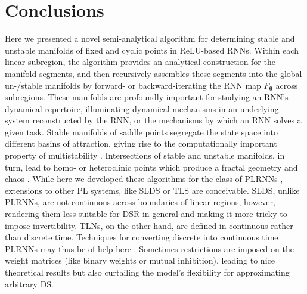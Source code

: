 \documentclass{article}
\theoremstyle{example}
\theoremstyle{plain}
\theoremstyle{definition}
\theoremstyle{remark}
\begin{document}
\section{Conclusions}
Here we presented a novel semi-analytical algorithm for determining stable and unstable manifolds of fixed and cyclic points in ReLU-based RNNs. Within each linear subregion, the algorithm provides an analytical construction for the manifold segments, and then recursively assembles these segments into the global un-/stable manifolds by forward- or backward-iterating the RNN map $F_{\mathbf{\theta}}$ across subregions.
These manifolds are profoundly important for studying an RNN's dynamical repertoire, illuminating dynamical mechanisms in an underlying system reconstructed by the RNN, or the mechanisms by which an RNN solves a given task. Stable manifolds of saddle points segregate the state space into different basins of attraction, giving rise to the computationally important property of multistability \citep{dur0, feu18}. Intersections of stable and unstable manifolds, in turn, lead to homo- or heteroclinic points which produce a fractal geometry and chaos \citep{wig}. 
While here we developed these algorithms for the class of PLRNNs \citep{brenner_tractable_2022,hess,brenner2024alrnn}, extensions to other PL systems, like SLDS \citep{linderman_bayesian_2017,linderman_recurrent_2016} or TLS \citep{parmelee2022core,morrison2016diversity,hahnloser2000permitted} are conceivable. SLDS, unlike PLRNNs, are not continuous across boundaries of linear regions, however, rendering them less suitable for DSR in general and making it more tricky to impose invertibility. TLNs, on the other hand, are defined in continuous rather than discrete time. Techniques for converting discrete into continuous time PLRNNs may thus be of help here \citep{mon2}. Sometimes restrictions are imposed on the weight matrices (like binary weights or mutual inhibition), leading to nice theoretical results \citep{curto2023graph,parmelee2022core,morrison2016diversity} but also curtailing the model's flexibility for approximating arbitrary DS.
\end{document}
